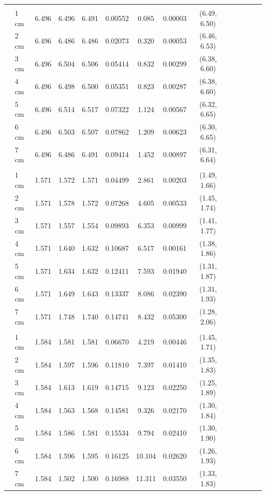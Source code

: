 \documentclass[a4paper 12pt]{article}
\numberwithin{equation}{section}
\begin{document}
{\begin{small}
\begin{table}[h!]
\begin{footnotesize}
\begin{tabular}{clclclclclclcl}
 \raisebox{1ex}{\bf age 2}  \\ [1.0ex]
&    1 cm & 6.496 &    6.496 & 6.491 &          0.00552& 0.085 & 0.00003 & (6.49, 6.50)\\
&    2 cm & 6.496 &    6.486 & 6.486 &          0.02073& 0.320 & 0.00053 & (6.46, 6.53)\\
&    3 cm & 6.496 &    6.504 & 6.506 &          0.05414& 0.832 & 0.00299 & (6.38, 6.60)\\
&    4 cm & 6.496 &    6.498 & 6.500 &          0.05351& 0.823 & 0.00287 & (6.38, 6.60)\\
&    5 cm & 6.496 &    6.514 & 6.517 &          0.07322& 1.124 & 0.00567 & (6.32, 6.65)\\
&    6 cm & 6.496 &    6.503 & 6.507 &          0.07862& 1.209 & 0.00623 & (6.30, 6.65)\\
&    7 cm & 6.496 &    6.486 & 6.491 &          0.09414& 1.452 & 0.00897 & (6.31, 6.64)\\[1.5ex]

 \raisebox{1ex}{\bf age 3}  \\ [1.0ex]
&   1 cm & 1.571 &    1.572  & 1.571 &         0.04499& 2.861  & 0.00203 & (1.49, 1.66)\\
&   2 cm & 1.571 &    1.578  & 1.572 &         0.07268& 4.605  & 0.00533 & (1.45, 1.74)\\
&   3 cm & 1.571 &    1.557  & 1.554 &         0.09893& 6.353  & 0.00999 & (1.41, 1.77)\\
&   4 cm & 1.571 &    1.640  & 1.632 &         0.10687& 6.517  & 0.00161 & (1.38, 1.86)\\
&   5 cm & 1.571 &    1.634  & 1.632 &         0.12411& 7.593  & 0.01940 & (1.31, 1.87)\\
&   6 cm & 1.571 &    1.649  & 1.643 &         0.13337& 8.086  & 0.02390 & (1.31, 1.93)\\
&   7 cm & 1.571 &    1.748  & 1.740 &         0.14741& 8.432  & 0.05300 & (1.28, 2.06) \\[1.5ex]

 \raisebox{1ex}{\bf age 4}  \\ [1.0ex]
&   1 cm & 1.584 &    1.581  & 1.581 &         0.06670& 4.219   & 0.00446 & (1.45, 1.71)\\
&   2 cm & 1.584 &    1.597  & 1.596 &         0.11810& 7.397   & 0.01410 & (1.35, 1.83)\\
&   3 cm & 1.584 &    1.613  & 1.619 &         0.14715& 9.123   & 0.02250 & (1.25, 1.89)\\
&   4 cm & 1.584 &    1.563  & 1.568 &         0.14581& 9.326   & 0.02170 & (1.30, 1.84)\\
&   5 cm & 1.584 &    1.586  & 1.581 &         0.15534& 9.794   & 0.02410 & (1.30, 1.90)\\
&   6 cm & 1.584 &    1.596  & 1.595 &         0.16125& 10.104  & 0.02620 & (1.26, 1.93)\\
&   7 cm & 1.584 &    1.502  & 1.500 &         0.16988& 11.311  & 0.03550 & (1.33, 1.83) \\[1.5ex]


\end{tabular}
\end{footnotesize}
\end{table}
\end{small}}
\end{document}
